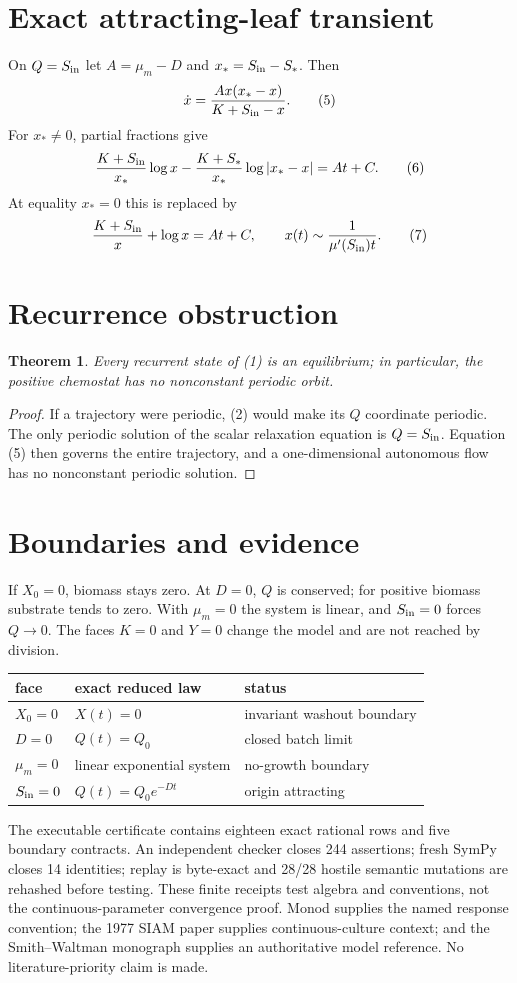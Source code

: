 \documentclass[10pt]{article}
\newtheorem{theorem}{Theorem}
\begin{document}
\section{Exact attracting-leaf transient}
On $Q=S_{\rm in}$ let $A=\mu_m-D$ and $x_*=S_{\rm in}-S_*$. Then
\[
 \dot x=\frac{A x(x_*-x)}{K+S_{\rm in}-x}. \tag{5}
\]
For $x_*\ne0$, partial fractions give
\[
 \frac{K+S_{\rm in}}{x_*}\log x-
 \frac{K+S_*}{x_*}\log|x_*-x|=At+C. \tag{6}
\]
At equality $x_*=0$ this is replaced by
\[
 \frac{K+S_{\rm in}}{x}+\log x=At+C,
 \qquad x(t)\sim \frac{1}{\mu'(S_{\rm in})t}. \tag{7}
\]
\section{Recurrence obstruction}
\begin{theorem}
Every recurrent state of (1) is an equilibrium; in particular, the positive
chemostat has no nonconstant periodic orbit.
\end{theorem}
\begin{proof}
If a trajectory were periodic, (2) would make its $Q$ coordinate periodic.
The only periodic solution of the scalar relaxation equation is
$Q=S_{\rm in}$.  Equation (5) then governs the entire trajectory, and a
one-dimensional autonomous flow has no nonconstant periodic solution.
\end{proof}
\section{Boundaries and evidence}
If $X_0=0$, biomass stays zero.  At $D=0$, $Q$ is conserved; for positive
biomass substrate tends to zero.  With $\mu_m=0$ the system is linear, and
$S_{\rm in}=0$ forces $Q\to0$.  The faces $K=0$ and $Y=0$ change the model
and are not reached by division.
\begin{center}
\small
\begin{tabular}{lll}
\toprule
face & exact reduced law & status\\
\midrule
$X_0=0$ & $X(t)=0$ & invariant washout boundary\\
$D=0$ & $Q(t)=Q_0$ & closed batch limit\\
$\mu_m=0$ & linear exponential system & no-growth boundary\\
$S_{\rm in}=0$ & $Q(t)=Q_0e^{-Dt}$ & origin attracting\\
\bottomrule
\end{tabular}
\end{center}

The executable certificate contains eighteen exact rational rows and five
boundary contracts.  An independent checker closes 244 assertions;
fresh SymPy closes 14 identities; replay is byte-exact and 28/28 hostile
semantic mutations are rehashed before testing.  These finite receipts test
algebra and conventions, not the continuous-parameter convergence proof.
Monod supplies the named response convention; the 1977 SIAM paper supplies
continuous-culture context; and the Smith--Waltman monograph supplies an
authoritative model reference.  No literature-priority claim is made.
\end{document}
